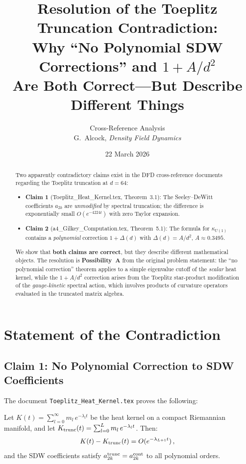 \documentclass[12pt,a4paper]{article}
\title{Resolution of the Toeplitz Truncation Contradiction:\\[6pt]
\large Why ``No Polynomial SDW Corrections'' and $1+A/d^2$\\
Are Both Correct---But Describe Different Things}
\author{Cross-Reference Analysis\\
G.\ Alcock, \textit{Density Field Dynamics}}
\date{22 March 2026}
\theoremstyle{definition}
\begin{document}
\maketitle

\begin{abstract}
Two apparently contradictory claims exist in the DFD cross-reference
documents regarding the Toeplitz truncation at $d=64$:
\begin{itemize}[nosep]
\item \textbf{Claim 1} (Toeplitz\_Heat\_Kernel.tex, Theorem~3.1):
  The Seeley--DeWitt coefficients $a_{2k}$ are \emph{unmodified} by spectral
  truncation; the difference is exponentially small $O(e^{-4224t})$ with
  zero Taylor expansion.
\item \textbf{Claim 2} (a4\_Gilkey\_Computation.tex, Theorem~5.1):
  The formula for $\kappa_{U(1)}$ contains a \emph{polynomial}
  correction $1 + \Delta(d)$ with $\Delta(d) = A/d^2$, $A \approx 0.3495$.
\end{itemize}
We show that \textbf{both claims are correct}, but they describe different
mathematical objects.  The resolution is \textbf{Possibility~A} from the
original problem statement: the ``no polynomial correction'' theorem
applies to a simple eigenvalue cutoff of the \emph{scalar} heat kernel,
while the $1+A/d^2$ correction arises from the Toeplitz star-product
modification of the \emph{gauge-kinetic} spectral action, which involves
products of curvature operators evaluated in the truncated matrix algebra.
\end{abstract}

\tableofcontents
\newpage

\section{Statement of the Contradiction}
\label{sec:contradiction}

\subsection{Claim 1: No Polynomial Correction to SDW Coefficients}

The document \texttt{Toeplitz\_Heat\_Kernel.tex} proves the following:

\begin{tcolorbox}[title=Theorem 3.1 (SDW Coefficients Unmodified)]
Let $K(t) = \sum_{l=0}^{\infty} m_l\,e^{-\lambda_l t}$ be the heat kernel
on a compact Riemannian manifold, and let
$K_{\rm trunc}(t) = \sum_{l=0}^{L} m_l\,e^{-\lambda_l t}$.
Then:
\begin{equation}
K(t) - K_{\rm trunc}(t) = O(e^{-\lambda_{L+1}t})\,,
\end{equation}
and the SDW coefficients satisfy
$a_{2k}^{\rm trunc} = a_{2k}^{\rm cont}$ to all polynomial orders.
\end{tcolorbox}
\end{document}
